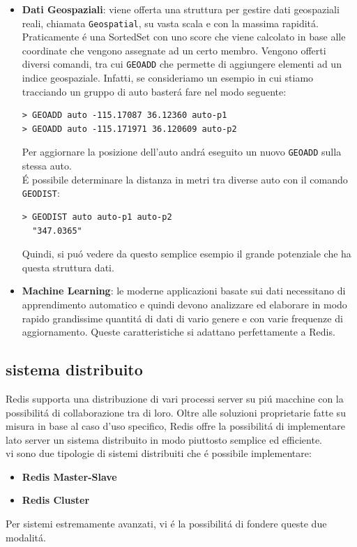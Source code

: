 \begin{itemize}
    \item \textbf{Dati Geospaziali}: viene offerta una struttura per gestire dati geospaziali reali, chiamata \texttt{Geospatial},
    su vasta scala e con la massima rapiditá. Praticamente é una SortedSet con uno score che viene calcolato in base alle coordinate che vengono assegnate ad un certo membro.
    Vengono offerti diversi comandi, tra cui \texttt{GEOADD} che permette di aggiungere elementi ad un indice geospaziale.
    Infatti, se consideriamo un esempio in cui stiamo tracciando un gruppo di auto basterá fare nel modo seguente:
    \begin{lstlisting}[autogobble]
> GEOADD auto -115.17087 36.12360 auto-p1
> GEOADD auto -115.171971 36.120609 auto-p2\end{lstlisting}
    Per aggiornare la posizione dell'auto andrá eseguito un nuovo \texttt{GEOADD} sulla stessa auto.\\
    É possibile determinare la distanza in metri tra diverse auto con il comando \texttt{GEODIST}:
    \begin{lstlisting}[autogobble]
> GEODIST auto auto-p1 auto-p2
  "347.0365"\end{lstlisting}
    Quindi, si puó vedere da questo semplice esempio il grande potenziale che ha questa struttura dati.
    \item \textbf{Machine Learning}: le moderne applicazioni basate sui dati necessitano di apprendimento automatico e quindi devono analizzare
    ed elaborare in modo rapido grandissime quantitá di dati di vario genere e con varie frequenze di aggiornamento. Queste caratteristiche
    si adattano perfettamente a Redis.
\end{itemize}

\subsection{sistema distribuito}
Redis supporta una distribuzione di vari processi server su piú macchine con la possibilitá di collaborazione tra di loro.
Oltre alle soluzioni proprietarie fatte su misura in base al caso d'uso specifico, Redis offre la possibilitá di implementare lato server un
sistema distribuito in modo piuttosto semplice ed efficiente.\\
vi sono due tipologie di sistemi distribuiti che é possibile implementare:
\begin{itemize}
    \item \textbf{Redis Master-Slave}
    \item \textbf{Redis Cluster}
\end{itemize}
Per sistemi estremamente avanzati, vi é la possibilitá di fondere queste due modalitá.
